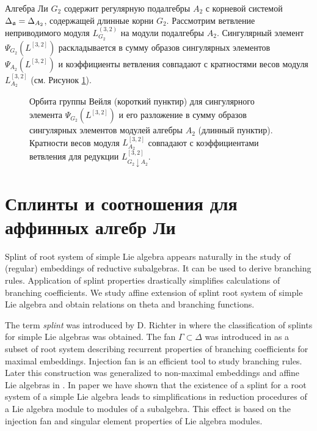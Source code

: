 \vspace{10mm}
\begin{example}
  Алгебра Ли  $G_{2}$ содержит регулярную подалгебры  $A_{2}$ с корневой системой $\Delta_{\mathfrak{a}}=\Delta_{A_{2}}$, содержащей длинные корни $G_{2}$. Рассмотрим ветвление неприводимого модуля $L_{G_{2}}^{(3,2)}$ на модули подалгебры $A_{2}$. Сингулярный элемент $\Psi_{G_{2}}(L^{[3,2]})$ раскладывается в сумму образов сингулярных элементов  $\Psi_{A_{2}}(L^{[3,2]})$ и коэффициенты ветвления совпадают с кратностями весов модуля $L^{[3,2]}_{A_{2}}$ (см. Рисунок \ref{fig:g2_splint}).


  \begin{figure}[h!bt]
  \noindent\centering{
   \texttt{[image: g2]}
  }

  \caption{Орбита группы Вейля  (короткий пунктир) для сингулярного элемента  $\Psi_{G_{2}}(L^{[3,2]})$ и его разложение в сумму образов сингулярных элементов модулей алгебры $A_{2}$ (длинный пунктир). Кратности весов модуля $L^{[3,2]}_{A_{2}}$ совпадают с коэффициентами ветвления для редукции $L^{[3,2]}_{G_{2}\downarrow A_{2}}$.}


 \label{fig:g2_splint}
\end{figure}

\end{example}

\section{Сплинты и соотношения для аффинных алгебр Ли}
\label{sec:splints-affine}

Splint of root system of simple Lie algebra appears naturally in
the study of (regular) embeddings of reductive subalgebras. It can
be used to derive branching rules. Application of
splint properties drastically simplifies calculations of
branching coefficients. We study affine extension of splint root system of simple Lie algebra and obtain relations on theta and branching functions.

The term {\it splint} was introduced by D. Richter in \cite{richter2008splints} where the
classification of splints for simple Lie algebras was obtained. The fan $\Gamma \subset \Delta$ was
introduced in \cite{lyakhovsky1996rra} as a subset of root system describing recurrent properties of
branching coefficients for maximal embeddings. Injection fan is an efficient tool to study branching
rules. Later this construction was generalized to non-maximal embeddings and affine Lie algebras in
\cite{2010arXiv1007.0318L, ilyin812pbc}. In paper \cite{2011arXiv1111.6787L} we have shown that the
existence of a splint for a root system of a simple Lie algebra leads to simplifications in
reduction procedures of a Lie algebra module to modules of a subalgebra. This effect is based on the
injection fan and singular element properties of Lie algebra modules.

